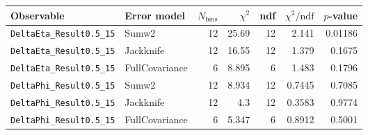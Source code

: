 \begin{tabular}{|l|l|r|r|r|r|r|}
\hline
Observable & Error model & $N_{\mathrm{bins}}$ & $\chi^2$ & ndf & $\chi^2/\mathrm{ndf}$ & $p$-value \\
\hline
\texttt{DeltaEta\_Result0.5\_15} & Sumw2 & 12 & 25.69 & 12 & 2.141 & 0.01186 \\
\texttt{DeltaEta\_Result0.5\_15} & Jackknife & 12 & 16.55 & 12 & 1.379 & 0.1675 \\
\texttt{DeltaEta\_Result0.5\_15} & FullCovariance & 6 & 8.895 & 6 & 1.483 & 0.1796 \\
\texttt{DeltaPhi\_Result0.5\_15} & Sumw2 & 12 & 8.934 & 12 & 0.7445 & 0.7085 \\
\texttt{DeltaPhi\_Result0.5\_15} & Jackknife & 12 & 4.3 & 12 & 0.3583 & 0.9774 \\
\texttt{DeltaPhi\_Result0.5\_15} & FullCovariance & 6 & 5.347 & 6 & 0.8912 & 0.5001 \\
\hline
\end{tabular}
